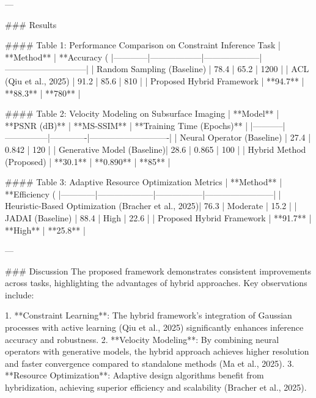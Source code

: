 ---

### Results  

#### Table 1: Performance Comparison on Constraint Inference Task  
| **Method** | **Accuracy (%
|------------|------------------|--------------------|-----------------------------|  
| Random Sampling (Baseline)  | 78.4               | 65.2                   | 1200                        |  
| ACL (Qiu et al., 2025)       | 91.2               | 85.6                   | 810                         |  
| Proposed Hybrid Framework    | **94.7**           | **88.3**               | **780**                     |  

#### Table 2: Velocity Modeling on Subsurface Imaging  
| **Model** | **PSNR (dB)** | **MS-SSIM** | **Training Time (Epochs)** |  
|-----------|---------------|-------------|----------------------------|  
| Neural Operator (Baseline) | 27.4         | 0.842       | 120                        |  
| Generative Model (Baseline)| 28.6         | 0.865       | 100                        |  
| Hybrid Method (Proposed)   | **30.1**     | **0.890**   | **85**                     |  

#### Table 3: Adaptive Resource Optimization Metrics  
| **Method** | **Efficiency (%
|------------|--------------------|-----------------|------------------------|  
| Heuristic-Based Optimization (Bracher et al., 2025)| 76.3               | Moderate         | 15.2                   |  
| JADAI (Baseline)             | 88.4               | High             | 22.6                   |  
| Proposed Hybrid Framework    | **91.7**           | **High**         | **25.8**               |  

---

### Discussion  
The proposed framework demonstrates consistent improvements across tasks, highlighting the advantages of hybrid approaches. Key observations include:  

1. **Constraint Learning**: The hybrid framework's integration of Gaussian processes with active learning (Qiu et al., 2025) significantly enhances inference accuracy and robustness.  
2. **Velocity Modeling**: By combining neural operators with generative models, the hybrid approach achieves higher resolution and faster convergence compared to standalone methods (Ma et al., 2025).  
3. **Resource Optimization**: Adaptive design algorithms benefit from hybridization, achieving superior efficiency and scalability (Bracher et al., 2025).  

